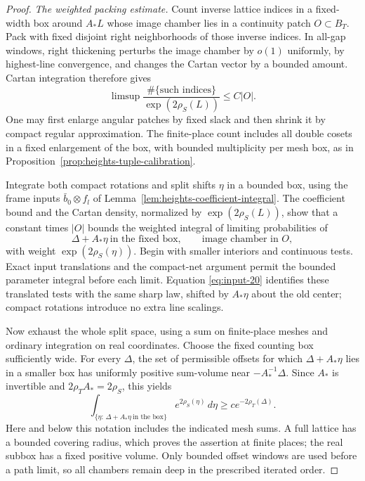\begin{proof}
\emph{The weighted packing estimate.}
Count inverse lattice indices in a fixed-width box around $A_*L$ whose
image chamber lies in a continuity patch $O\subset B_T$.  Pack with fixed
disjoint right neighborhoods of those inverse indices.  In all-gap
windows, right thickening perturbs the image chamber by $o(1)$ uniformly,
by highest-line convergence, and changes the Cartan vector by a bounded
amount.  Cartan integration therefore gives
\[
 \limsup\frac{\#\{\text{such indices}\}}{\exp(2\rho_S(L))}
 \leq C|O|.
\]
One may first enlarge angular patches by fixed slack and then shrink it by
compact regular approximation.  The finite-place count includes all
double cosets in a fixed enlargement of the box, with bounded multiplicity
per mesh box, as in Proposition~\ref{prop:heights-tuple-calibration}.

Integrate both compact rotations and split shifts $\eta$ in a bounded box,
using the frame inputs $\bar b_0\otimes f_l$ of
Lemma~\ref{lem:heights-coefficient-integral}.  The coefficient bound and
the Cartan density, normalized by $\exp(2\rho_S(L))$, show that a constant
times $|O|$ bounds the weighted integral of limiting probabilities of
\[
 \Delta+A_*\eta\ \text{in the fixed box},
 \qquad\text{image chamber in }O,
\]
with weight $\exp(2\rho_S(\eta))$.  Begin with smaller interiors and
continuous tests.  Exact input translations and the compact-net argument
permit the bounded parameter integral before each limit.  Equation
\eqref{eq:input-20} identifies these translated tests with the same sharp
law, shifted by $A_*\eta$ about the old center; compact rotations introduce
no extra line scalings.

Now exhaust the whole split space, using a sum on finite-place meshes and
ordinary integration on real coordinates.  Choose the fixed counting box
sufficiently wide.  For every $\Delta$, the set of permissible offsets for
which $\Delta+A_*\eta$ lies in a smaller box has uniformly positive
sum-volume near $-A_*^{-1}\Delta$.  Since $A_*$ is invertible and
$2\rho_TA_*=2\rho_S$, this yields
\[
 \int_{\{\eta:\,\Delta+A_*\eta\ \text{in the box}\}}
       e^{2\rho_S(\eta)}\,d\eta
 \geq c e^{-2\rho_T(\Delta)}.
\]
Here and below this notation includes the indicated mesh sums.  A full
lattice has a bounded covering radius, which proves the assertion at
finite places; the real subbox has a fixed positive volume.  Only bounded
offset windows are used before a path limit, so all chambers remain deep
in the prescribed iterated order.


\end{proof}
